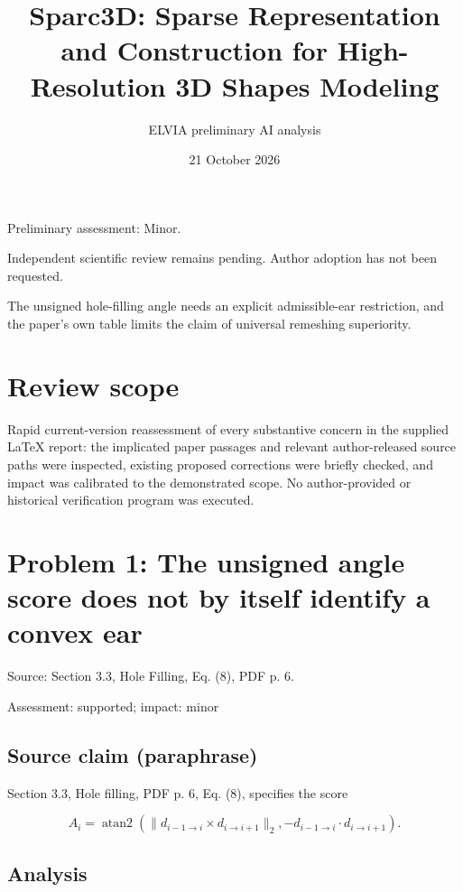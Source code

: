 \documentclass[11pt]{article}
\begin{document}
\title{Sparc3D: Sparse Representation and Construction for High-Resolution 3D Shapes Modeling}

\author{ELVIA preliminary AI analysis}\date{21 October 2026}\maketitle

Preliminary assessment: Minor.\par

Independent scientific review remains pending. Author adoption has not been requested.

The unsigned hole-filling angle needs an explicit admissible-ear restriction, and the paper's own table limits the claim of universal remeshing superiority.

\section*{Review scope}

Rapid current-version reassessment of every substantive concern in the supplied LaTeX report: the implicated paper passages and relevant author-released source paths were inspected, existing proposed corrections were briefly checked, and impact was calibrated to the demonstrated scope. No author-provided or historical verification program was executed.

\section*{Problem 1: The unsigned angle score does not by itself identify a convex ear}

Source: Section 3.3, Hole Filling, Eq. (8), PDF p. 6.

Assessment: supported; impact: minor

\subsection*{Source claim (paraphrase)}

Section 3.3, Hole filling, PDF p. 6, Eq. (8), specifies the score

\[ A_i=\operatorname{atan2}\!\left( \|d_{i-1\to i}\times d_{i\to i+1}\|_2, -d_{i-1\to i}\cdot d_{i\to i+1}\right). \]

\subsection*{Analysis}
\end{document}
